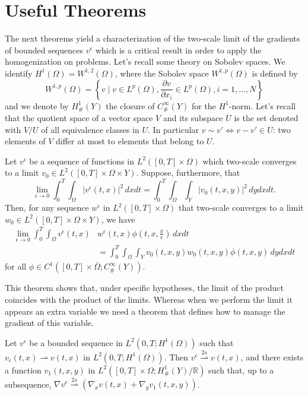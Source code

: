 \section{Useful Theorems}
The next theorems yield a characterization of the two-scale limit of the gradients of bounded sequences $v^{\epsilon}$ which is a critical result in order to apply the homogenization on problems. Let's recall some theory on Sobolev spaces.
We identify $H^{1}(\Omega)=W^{1,2}(\Omega)$, where the Sobolev space $W^{1, p}(\Omega)$ is defined by
$$
W^{1, p}(\Omega)=\left\{v \mid v \in L^{p}(\Omega), \frac{\partial v}{\partial x_{i}} \in L^{p}(\Omega), i=1, \ldots, N\right\}
$$
and we denote by $H_{\#}^{1}(Y)$ the closure of $C_{\#}^{\infty}(Y)$ for the $H^{1}$-norm.
Let's recall that the quotient space of a vector space $V$ and its subspace $U$ is the set denoted with $V/U$ of all equivalence classes in $U$. In particular $v \sim v' \iff v-v'\in U$: two elements of $V$ differ at most to elements that belong to $U$.
\begin{theorem}
Let $v^{\epsilon}$ be a sequence of functions in $L^{2}([0, T] \times \Omega)$ which two-scale converges to a limit $v_{0} \in L^{2}([0, T] \times \Omega \times Y)$. Suppose, furthermore, that
$$
\lim _{\epsilon \rightarrow 0} \int_{0}^{T} \int_{\Omega}\left|v^{\epsilon}(t, x)\right|^{2} \, dxdt=\int_{0}^{T} \int_{\Omega} \int_{Y}\left|v_{0}(t, x, y)\right|^{2} \, dy dx dt.
$$
Then, for any sequence $w^{\epsilon}$ in $L^{2}([0, T] \times \Omega)$ that two-scale converges to a limit $w_{0} \in L^{2}([0, T] \times \Omega \times Y)$, we have
$$
\begin{aligned}
\lim _{\epsilon \rightarrow 0} \int_{0}^{T} \int_{\Omega} v^{\epsilon}(t, x) & w^{\epsilon}(t, x) \phi\left(t, x, \frac{x}{\epsilon}\right) \, dxdt \\
&=\int_{0}^{T} \int_{\Omega} \int_{Y} v_{0}(t, x, y) w_{0}(t, x, y) \phi(t, x, y) \, dy dx dt
\end{aligned}
$$for all $\phi \in C^{1}\left([0, T] \times \bar{\Omega} ; C_{\#}^{\infty}(Y)\right)$.
\label{theorem:5.1}\end{theorem}
This theorem shows that, under specific hypotheses, the limit of the product coincides with the product of the limits. Whereas when we perform the limit it appears an extra variable we need a theorem that defines how to manage the gradient of this variable.
\begin{theorem}
Let $v^{\epsilon}$ be a bounded sequence in $L^{2}\left(0, T ; H^{1}(\Omega)\right)$ such that $v_{\epsilon}(t,x)\rightharpoonup v(t,x)$  in $L^{2}\left(0, T ; H^{1}(\Omega)\right)$. Then $v^{\epsilon} \overset{2s}{\rightharpoonup} v(t, x)$, and there exists a function $v_{1}(t, x, y)$ in $L^{2}\left([0, T] \times \Omega ; H_{\#}^{1}(Y) / \mathbb{R}\right)$ such that, up to a subsequence, $\nabla v^{\epsilon}  \overset{2s}{\rightharpoonup} \left(\nabla_{x} v(t, x)+\nabla_{y} v_{1}(t, x, y)\right)$. 
\label{theorem:5.2}\end{theorem}
